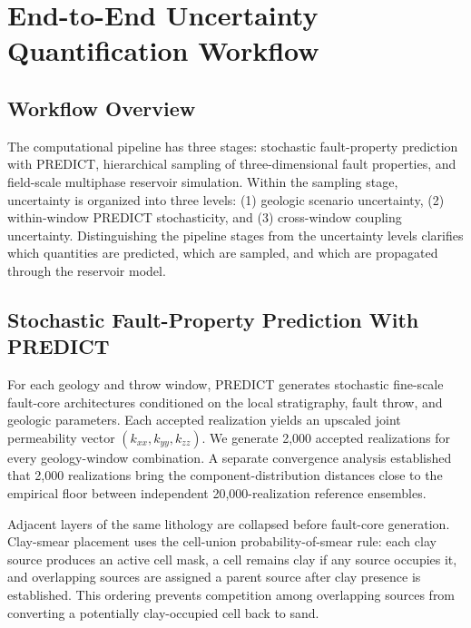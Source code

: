 
\section{End-to-End Uncertainty Quantification Workflow}

\subsection{Workflow Overview}

The computational pipeline has three stages: stochastic fault-property
prediction with PREDICT, hierarchical sampling of three-dimensional fault
properties, and field-scale multiphase reservoir simulation. Within the
sampling stage, uncertainty is organized into three levels: (1) geologic
scenario uncertainty, (2) within-window PREDICT stochasticity, and (3)
cross-window coupling uncertainty. Distinguishing the pipeline stages from the
uncertainty levels clarifies which quantities are predicted, which are sampled,
and which are propagated through the reservoir model.


\subsection{Stochastic Fault-Property Prediction With PREDICT}

For each geology and throw window, PREDICT generates stochastic fine-scale
fault-core architectures conditioned on the local stratigraphy, fault throw,
and geologic parameters. Each accepted realization yields an upscaled joint
permeability vector $(k_{xx},k_{yy},k_{zz})$. We generate 2,000 accepted
realizations for every geology-window combination. A separate convergence
analysis established that 2,000 realizations bring the component-distribution
distances close to the empirical floor between independent 20,000-realization
reference ensembles.

Adjacent layers of the same lithology are collapsed before fault-core
generation. Clay-smear placement uses the cell-union probability-of-smear
rule: each clay source produces an active cell mask, a cell remains clay if
any source occupies it, and overlapping sources are assigned a parent source
after clay presence is established. This ordering prevents competition among
overlapping sources from converting a potentially clay-occupied cell back to
sand.

